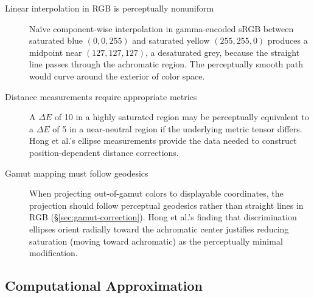 \begin{description}
    \item[Linear interpolation in RGB is perceptually nonuniform] Naïve component-wise interpolation in gamma-encoded sRGB between saturated blue $(0, 0, 255)$ and saturated yellow $(255, 255, 0)$ produces a midpoint near $(127, 127, 127)$, a desaturated grey, because the straight line passes through the achromatic region. The perceptually smooth path would curve around the exterior of color space.
    
    \item[Distance measurements require appropriate metrics] A $\Delta E$ of 10 in a highly saturated region may be perceptually equivalent to a $\Delta E$ of 5 in a near-neutral region if the underlying metric tensor differs. Hong et al.'s ellipse measurements \citep{hong2025} provide the data needed to construct position-dependent distance corrections.

    
    \item[Gamut mapping must follow geodesics] When projecting out-of-gamut colors to displayable coordinates, the projection should follow perceptual geodesics rather than straight lines in RGB (\S\ref{sec:gamut-correction}). Hong et al.'s finding that discrimination ellipses orient radially toward the achromatic center \citep{hong2025} justifies reducing saturation (moving toward achromatic) as the perceptually minimal modification.
\end{description}

\subsection{Computational Approximation}

